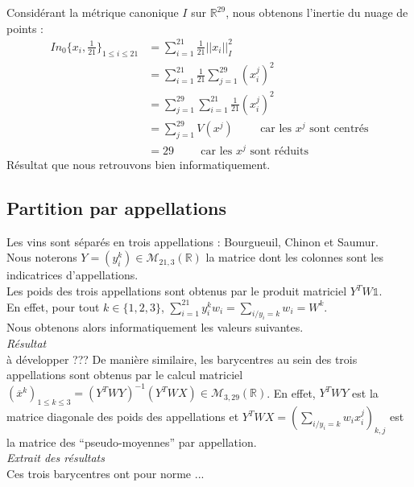 \documentclass[a4paper,10pt]{article}
\newcommand{\R}{\mathbb{R}}
\newcommand{\hs}[1]{\hspace{#1cm}}
\newcommand{\dsum}[2]{\displaystyle\sum_{#1}^{#2}}
\begin{document}
Considérant la métrique canonique $I$ sur $\R^{29}$, nous obtenons l'inertie du nuage de points : 
$$\begin{array}{ll}
In_0\{x_i,\frac 1{21}\}_{1\leqslant i\leqslant 21}
&=\dsum{i=1}{21}\frac 1{21}|\!|x_i|\!|^2_I\\
&=\dsum{i=1}{21}\frac 1{21}\dsum{j=1}{29}(x_i^j)^2\\
&=\dsum{j=1}{29}\dsum{i=1}{21}\frac 1{21}(x_i^j)^2\\
&=\dsum{j=1}{29}V(x^j) \hs{1} \text{car les $x^j$ sont centrés}\\
&=29 \hs1 \text{car les $x^j$ sont réduits}
\end{array}$$
Résultat que nous retrouvons bien informatiquement. 






\subsection{Partition par appellations}

Les vins sont séparés en trois appellations : Bourgueuil, Chinon et Saumur. \\
Nous noterons $Y=(y_i^k)\in\mathcal M_{21,3}(\R)$ la matrice dont les colonnes sont les indicatrices d'appellations. \\
Les poids des trois appellations sont obtenus par le produit matriciel $Y^TW\mathbb 1$. \\
En effet, pour tout $k\in\{1,2,3\}$, $\dsum{i=1}{21}y_i^kw_i=\dsum{i/y_i=k}{}w_i=W^k$.\\
Nous obtenons alors informatiquement les valeurs suivantes. \\

\textit{Résultat}\\

{\red à développer ???} De manière similaire, les barycentres au sein des trois appellations sont obtenus par le calcul matriciel $(\overline x^k)_{1\leqslant k\leqslant 3} =(Y^TWY)^{-1}(Y^TWX)\in \mathcal M_{3,29}(\R)$. En effet, $Y^TWY$ est la matrice diagonale des poids des appellations et $Y^TWX=\left(\dsum{i/y_i=k}{}w_ix_i^j\right)_{k,j}$ est la matrice des ``pseudo-moyennes'' par appellation.\\

\textit{Extrait des résultats}\\

Ces trois barycentres ont pour norme ...\\
\end{document}
